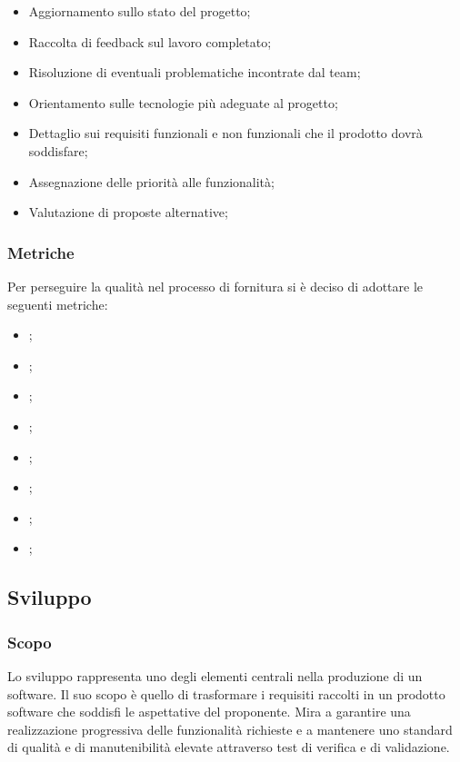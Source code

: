         \begin{itemize}
            \item Aggiornamento sullo stato del progetto;
            \item Raccolta di feedback sul lavoro completato;
            \item Risoluzione di eventuali problematiche incontrate dal team;
            \item Orientamento sulle tecnologie più adeguate al progetto;
            \item Dettaglio sui requisiti funzionali e non funzionali che il prodotto dovrà soddisfare;
            \item Assegnazione delle priorità alle funzionalità;
            \item Valutazione di proposte alternative;
        \end{itemize}

        \subsubsection{Metriche}
        Per perseguire la qualità nel processo di fornitura si è deciso di adottare le seguenti metriche:
       \begin{itemize}
            \item {};
            \item {};
            \item {};
            \item {};
            \item {};
            \item {};
            \item {};
            \item {};
       \end{itemize}

    \subsection{Sviluppo}
        \subsubsection{Scopo}
        Lo sviluppo rappresenta uno degli elementi centrali nella produzione di un software.
        Il suo scopo è quello di trasformare i requisiti raccolti in un 
        prodotto software che soddisfi le aspettative del 
        proponente. Mira a garantire una realizzazione progressiva delle 
        funzionalità richieste e a mantenere uno standard di qualità e di
        manutenibilità elevate attraverso test di verifica e di validazione.

